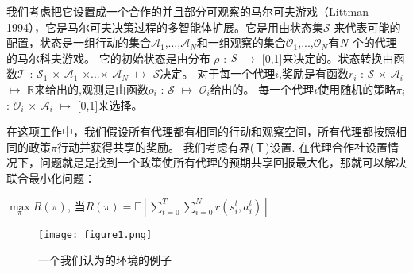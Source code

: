 我们考虑把它设置成一个合作的并且部分可观察的马尔可夫游戏（Littman 1994），它是马尔可夫决策过程的多智能体扩展。它是用由状态集$\mathcal{S}$ 来代表可能的配置，状态是一组行动的集合$\mathcal{A}_1$,...,$\mathcal{A}_N$和一组观察的集合$\mathcal{O}_1$,...,$\mathcal{O}_N$有$\emph{N}$ 个的代理的马尔科夫游戏。
它的初始状态是由分布 $\rho$ : $\emph{S}$ $\mapsto$ [0,1]来决定的。状态转换由函数$\mathcal{T}$ : $\mathcal{S}_1$ $\times$ $\mathcal{A}_1$ $\times$...$\times$ $\mathcal{A}_N$ $\mapsto$ $\mathcal{S}$决定。
对于每一个代理$i$,奖励是有函数$r_{i}$ : $\mathcal{S}$ $\times$ $\mathcal{A}_i$ $\mapsto$ $\mathbb{R}$来给出的,观测是由函数$o_{i}$ : $\mathcal{S}$ $\mapsto$ $\mathcal{O}_i$给出的。
每一个代理$i$使用随机的策略$\pi_{i}$ : $\mathcal{O}_i$ $\times$ $\mathcal{A}_i$ $\mapsto$  [0,1]来选择。
\par
在这项工作中，我们假设所有代理都有相同的行动和观察空间，所有代理都按照相同的政策$\pi$行动并获得共享的奖励。 我们考虑有界(Ｔ)设置. 在代理合作社设置情况下，问题就是是找到一个政策使所有代理的预期共享回报最大化，那就可以解决联合最小化问题：
\\
\par
 $\max \limits_{\pi} R(\pi)$, 当$R(\pi) = \mathbb{E}[\sum\limits_{t=0}^T\sum\limits_{i=0}^Nr(s_i^t,a_i^t)]$

\begin{figure}[htb]
	\centering
	\texttt{[image: figure1.png]}
	\caption{一个我们认为的环境的例子}\label{fig:环境例子}
\end{figure}

